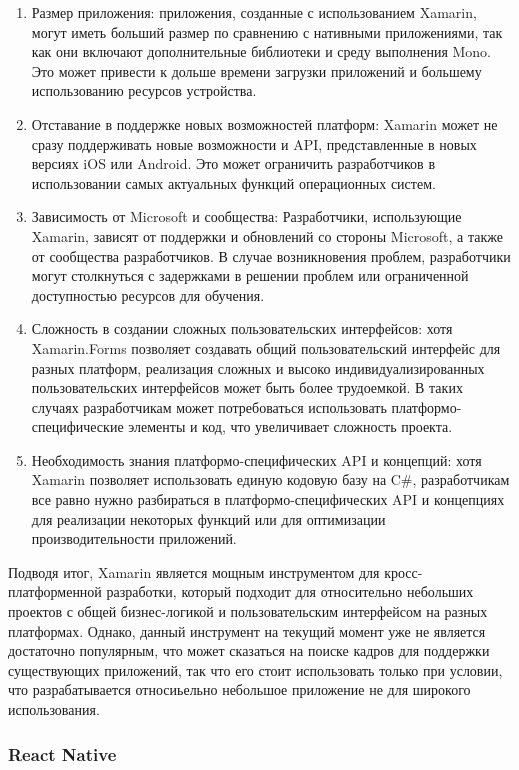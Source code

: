 \documentclass[14pt, russian]{scrartcl}
\begin{document}
\begin{enumerate}
    \item Размер приложения: приложения, созданные с использованием Xamarin, могут иметь больший размер по сравнению с нативными приложениями, так как они включают дополнительные библиотеки и среду выполнения Mono. Это может привести к дольше времени загрузки приложений и большему использованию ресурсов устройства.
    \item Отставание в поддержке новых возможностей платформ: Xamarin может не сразу поддерживать новые возможности и API, представленные в новых версиях iOS или Android. Это может ограничить разработчиков в использовании самых актуальных функций операционных систем.
    \item Зависимость от Microsoft и сообщества: Разработчики, использующие Xamarin, зависят от поддержки и обновлений со стороны Microsoft, а также от сообщества разработчиков. В случае возникновения проблем, разработчики могут столкнуться с задержками в решении проблем или ограниченной доступностью ресурсов для обучения.
    \item Сложность в создании сложных пользовательских интерфейсов: хотя Xamarin.Forms позволяет создавать общий пользовательский интерфейс для разных платформ, реализация сложных и высоко индивидуализированных пользовательских интерфейсов может быть более трудоемкой. В таких случаях разработчикам может потребоваться использовать платформо-специфические элементы и код, что увеличивает сложность проекта.
    \item Необходимость знания платформо-специфических API и концепций: хотя Xamarin позволяет использовать единую кодовую базу на C\#, разработчикам все равно нужно разбираться в платформо-специфических API и концепциях для реализации некоторых функций или для оптимизации производительности приложений.
\end{enumerate}

Подводя итог, Xamarin является мощным инструментом для кросс-платформенной разработки, который подходит для относительно небольших проектов с общей бизнес-логикой и пользовательским интерфейсом на разных платформах. Однако, данный инструмент на текущий момент уже не является достаточно популярным, что может сказаться на поиске кадров для поддержки существующих приложений, так что его стоит использовать только при условии, что разрабатывается относиьельно небольшое приложение не для широкого использования.

\subsubsection{React Native}
\end{document}
